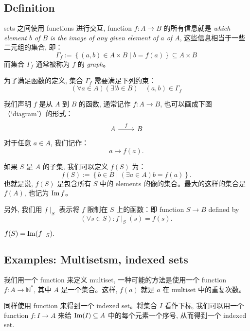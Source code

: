 \subsection{Definition}\label{sec:1.2.1}

sets 之间使用 functions 进行交互, function \(f : A \to B\) 的所有信息就是 \emph{which element \(b\) of \(B\) is the image of any given element of \(a\) of \(A\)}, 这些信息相当于一些二元组的集合, 即：
\[\Gamma_f := \left\{ \left(a, b\right) \in A \times B \mid b = f(a) \right\} \subseteq A \times B \]
而集合 \(\Gamma_f\) 通常被称为 \(f\) 的 \emph{graph}。

为了满足函数的定义, 集合 \(\Gamma_f\) 需要满足下列约束：
\[\left(\forall a \in A\right)\left(\exists! b \in B\right) \quad \left(a, b\right) \in \Gamma_f\]

我们声明 \(f\) 是从 \(A\) 到 \(B\) 的函数, 通常记作 \(f : A \to B\), 也可以画成下图（`diagram'）的形式：
\[\begin{tikzcd}
        A & B
        \arrow["f", from=1-1, to=1-2]
    \end{tikzcd}\]
对于任意 \(a \in A\), 我们记作：
\[a \mapsto f(a).\]

如果 \(S\) 是 \(A\) 的子集, 我们可以定义 \(f(S)\) 为：
\[f(S) := \left\{ b \in B \mid \left( \exists a \in A\right) b = f(a)\right\}.\]
也就是说, \(f(S)\) 是包含所有 \(S\) 中的 elements 的像的集合。最大的这样的集合是 \(f(A)\), 也记为 \(\operatorname{Im} f\)。

另外, 我们用 \(f\mid_S\) 表示将 \(f\) 限制在 \(S\) 上的函数：即 function \(S \to B\) defined by
\[\left( \forall s \in S\right): f\mid_S (s) = f(s).\]
\begin{note}
    \(f(S) = \operatorname{Im}(f\mid_S).\)
\end{note}

\subsection{Examples: Multisetsm, indexed sets}\label{sec:1.2.2}

\begin{eg}[Multiset]
    我们用一个 function 来定义 multiset, 一种可能的方法是使用一个 function \(f : A \to \mathbb{N}^{*}\), 其中 \(A\) 是一个集合。这样, \(f(a)\) 就是 \(a\) 在 multiset 中的重复次数。
\end{eg}
\begin{eg}
    同样使用 function 来得到一个 indexed set。将集合 \(I\) 看作下标, 我们可以用一个 function \(f : I \to A\) 来给 \(\operatorname{Im}(I) \subseteq A\) 中的每个元素一个序号, 从而得到一个 indexed set.
\end{eg}


